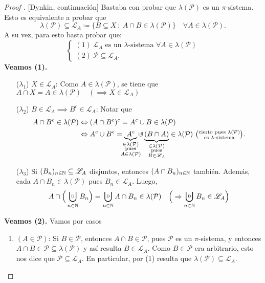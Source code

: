 \medskip
\begin{proof}[Proof ][Dynkin, continuación]
	Bastaba con probar que $\lambda{}(\mathcal{P})$ es un $\pi $-sistema. Esto es equivalente a probar que
	\[ \lambda(\mathcal{P}) \subseteq \mathscr{L}_A \coloneq \{B \subseteq X \ : \ A \cap B \in \lambda(\mathcal{P})\} \quad \forall A \in \lambda(\mathcal{P}). \]
	A su vez, para esto basta probar que:
	\[ \begin{cases}
		(1) \ \mathscr{L}_A \text{ es un } \lambda \text{-sistema } \forall A \in \lambda(\mathcal{P}) \\
		(2) \ \mathcal{P} \subseteq \mathscr{L}_A.
	\end{cases} \]
	\textbf{Veamos (1).}
	\begin{enumerate}
		\item[($\lambda_{1}$)] $X \in \mathscr{L}_A$: Como $A \in \lambda(\mathcal{P})$, se tiene que $A \cap X = A \in \lambda(\mathcal{P}) \quad (\implies X \in \mathscr{L}_A)$ \checkmark

		\item[($\lambda_{2}$)] $B \in \mathscr{L}_A \implies B^c \in \mathscr{L}_A$: Notar que
		\begin{align*}
			A \cap B^c \in \lambda(\mathcal{P}) & \iff (A \cap B^c)^c = A^c \cup B \in \lambda(\mathcal{P}) \\
			& \iff A^c \cup B^c = \underbrace{A^c}_{\mathclap{\substack{\in \lambda(\mathcal{P}) \\ \text{pues} \\ A \in \lambda(\mathcal{P})}}} \cupd \underbrace{(B \cap A)}_{\mathclap{\substack{\in \lambda(\mathcal{P}) \\ \text{pues} \\ B \in \mathscr{L}_A}}} \in \lambda(\mathcal{P}) \ \big(\substack{\text{cierto pues } \lambda(\mathcal{P}) \\ \text{es } \lambda \text{-sistema}}\big)
		.\end{align*}

		\item[($\lambda_{3}$)] Si $(B_n)_{n\in\mathbb{N}} \subseteq \mathscr{L}_A$ disjuntos, entonces $(A \cap B_n)_{n\in\mathbb{N}}$ también. Además, cada $A \cap B_n \in \lambda(\mathcal{P})$ pues $B_n \in \mathscr{L}_A$. Luego,
		\[ A \cap \Big( \bigcupd_{n\in\N} B_n \Big) = \bigcupd_{n\in\N} A \cap B_n \in \lambda(\mathcal{P}) \quad \Big(\implies \bigcupd_{n\in\N} B_n \in \mathscr{L}_A\Big) \]
	\end{enumerate}
	\textbf{Veamos (2).} Vamos por casos
	\begin{enumerate}
		\item $(A \in \mathcal{P})$: Si $B \in \mathcal{P}$, entonces $A \cap B \in \mathcal{P}$, pues $\mathcal{P}$ es un $\pi$-sistema, y entonces $A \cap B \in \mathcal{P} \subseteq \lambda(\mathcal{P})$ y así resulta $B \in \mathscr{L}_A$. Como $B \in \mathcal{P}$ era arbitrario, esto nos dice que $\mathcal{P} \subseteq \mathscr{L}_A$. En particular, por (1) resulta que $\lambda(\mathcal{P}) \subseteq \mathscr{L}_A$.


\end{enumerate}
\end{proof}
